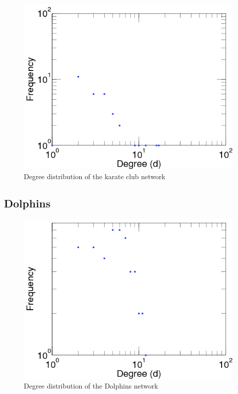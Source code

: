 \begin{figure}[!htb]
	\begin{center}
		\includegraphics[scale=.5]{images/zachary_degree_dist.png}
	\end{center}
	\caption{Degree distribution of the karate club network\cite{Kunegis2013}}
	\label{logo}
\end{figure}

\subsection{Dolphins}
\cite{Lusseau2003}
\begin{figure}[!htb]
	\begin{center}
		\includegraphics[scale=.5]{images/dolphins_degree_dist.png}
	\end{center}
	\caption{Degree distribution of the Dolphins network\cite{Kunegis2013}}
	\label{logo}
\end{figure}


